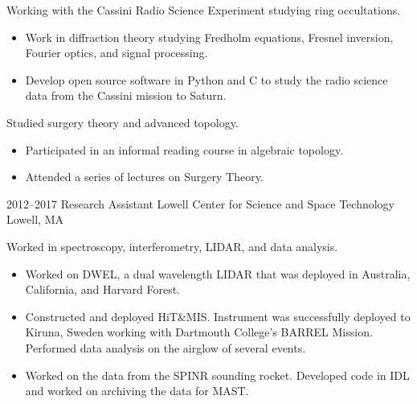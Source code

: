 \documentclass[a4paper,sans]{moderncv}
\begin{document}
            {%
                Working with the Cassini Radio Science
                Experiment studying ring occultations.
                \begin{itemize}
                    \item
                        Work in diffraction theory studying Fredholm
                        equations, Fresnel inversion, Fourier optics,
                        and signal processing.
                     \item
                        Develop open source software in Python and C to
                        study the radio science data from the
                        Cassini mission to Saturn.
                 \end{itemize}
                 Studied surgery theory and advanced topology.
                 \begin{itemize}
                     \item
                        Participated in an informal reading
                        course in algebraic topology.
                     \item
                        Attended a series of lectures on Surgery Theory.
                 \end{itemize}%
             }
        \cventry%
            {2012--2017}
            {Research Assistant}
            {Lowell Center for Science and Space Technology}
            {Lowell, MA}
            {}
            {%
                Worked in spectroscopy, interferometry,
                LIDAR, and data analysis.
                \begin{itemize}
                    \item
                        Worked on DWEL, a dual wavelength LIDAR that was
                        deployed in Australia, California, and Harvard Forest.
                    \item
                        Constructed and deployed HiT\&MIS.
                        Instrument was successfully deployed to Kiruna,
                        Sweden working with Dartmouth College's BARREL
                        Mission. Performed data analysis on the airglow of
                        several events.
                    \item
                        Worked on the data from the SPINR sounding rocket.
                        Developed code in IDL and worked on archiving the
                        data for MAST.
                \end{itemize}%
             }
\end{document}

